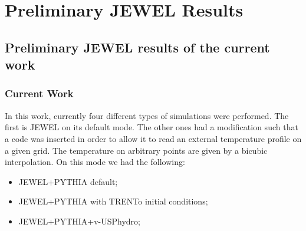 \documentclass{beamer}
\begin{document}
\section{Preliminary JEWEL Results}

\subsection{Preliminary JEWEL results of the current work}

\begin{frame}\frametitle{Current Work}
	In this work, currently four different types of simulations were performed. The first is JEWEL
	on its default mode. The other ones had a modification such that a code was
	inserted in order to allow it to read an external temperature profile on a given grid. The
	temperature on arbitrary points are given by a bicubic interpolation. On this mode we had
	the following:
	\begin{itemize}
		\item JEWEL+PYTHIA default;
		\pause
		\item JEWEL+PYTHIA with TRENTo initial conditions;
		\pause
		\item JEWEL+PYTHIA+v-USPhydro;
	\end{itemize}
\end{frame}
\end{document}
